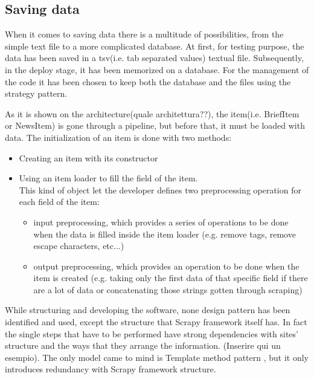 \subsection{Saving data}
When it comes to saving data there is a multitude of possibilities, from the simple text file to a more complicated database. 
At first, for testing purpose, the data has been saved in a tsv(i.e. tab separated values) textual file. Subsequently, in the deploy stage, it has been memorized on a database. For the management of the code it has been chosen to keep both the database and the files using the strategy pattern. 
\par
As it is shown on the architecture(quale architettura??), the item(i.e. BriefItem or NewsItem) is gone through a pipeline, but before that, it must be loaded with data.
The initialization of an item is done with two methods:
\begin{itemize}
	\item Creating an item with its constructor
	\item Using an item loader to fill the field of the item.\\
	This kind of object let the developer defines two preprocessing operation for each field of the item:
	\begin{itemize}
		\item input preprocessing, which provides a series of operations to be done when the data is filled inside the item loader (e.g. remove tags, remove escape characters, etc...)
		\item output preprocessing, which provides an operation to be done when the item is created (e.g. taking only the first data of that specific field if there are a lot of data or concatenating those strings gotten through scraping)
	\end{itemize}
\end{itemize}
\par While structuring and developing the software, none design pattern has been identified and used, except the structure that Scrapy framework itself has. In fact the single steps that have to be performed have strong dependencies with sites' structure and the ways that they arrange the information. (Inserire qui un esempio). The only model came to mind is Template method pattern \cite{templatepattern}, but it only introduces redundancy with Scrapy framework structure. 


